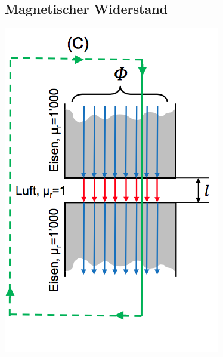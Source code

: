 \subsection{Magnetischer Widerstand}
\begin{minipage}{0.2 \linewidth}
    \includegraphics[width =\linewidth]{./Pics/VL2/magR}
\end{minipage}
